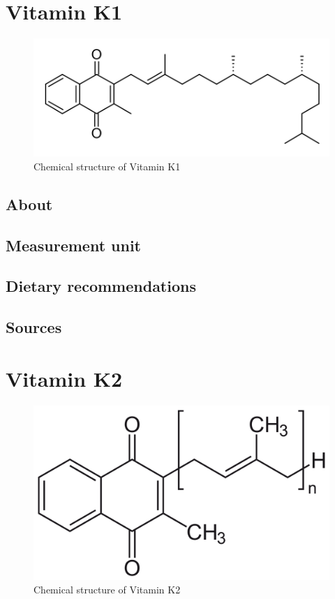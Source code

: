 \documentclass{book}
\begin{document}
\chapter{Vitamin K1}
\begin{figure}[h]
	\centering \includegraphics[width=0.75\linewidth]{images/Vitamin_K1_chemical_structure}
	\caption{Chemical structure of Vitamin K1}
\end{figure}

\section{About}


\section{Measurement unit}


\section{Dietary recommendations}


\section{Sources}


\chapter{Vitamin K2}
\begin{figure}[h]
	\centering \includegraphics[width=0.75\linewidth]{images/Vitamin_K2_chemical_structure}
	\caption{Chemical structure of Vitamin K2}
\end{figure}
\end{document}
